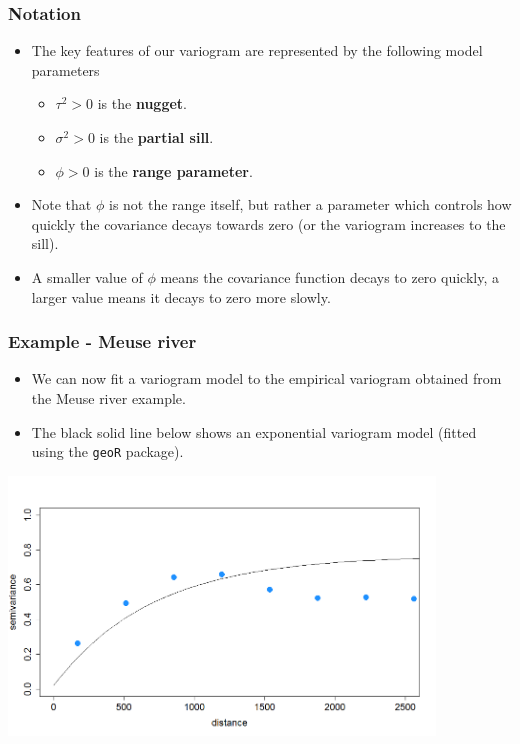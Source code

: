 \documentclass[parskip,12pt]{beamer}
\begin{document}
\begin{frame}
\frametitle{Notation}
 \begin{itemize}
\item The key features of our variogram are represented by the following model parameters
\begin{itemize}
\item $\tau^2 > 0$ is the \textbf{nugget}.
\item $\sigma^2 > 0$ is the \textbf{partial sill}.
\item $\phi > 0$ is the \textbf{range parameter}.
\end{itemize}
\vspace{3mm}
\item Note that $\phi$ is not the range itself, but rather a parameter which controls how quickly the covariance decays towards zero (or the variogram increases to the sill).
\vspace{3mm}
\item A smaller value of $\phi$ means the covariance function decays to zero quickly, a larger value means it decays to zero more slowly.
\end{itemize}
\end{frame}


\begin{frame}
\frametitle{Example - Meuse river}
\begin{itemize}
\vspace{2mm}
\item We can now fit a variogram model to the empirical variogram obtained from the Meuse river example.
\vspace{3mm}
\item The black solid line below shows an exponential variogram model (fitted using the \texttt{geoR} package).
\end{itemize}
    \begin{center}
     \includegraphics[width=0.85\textwidth]{MeuseModel}
          \end{center}
\end{frame}
\end{document}
